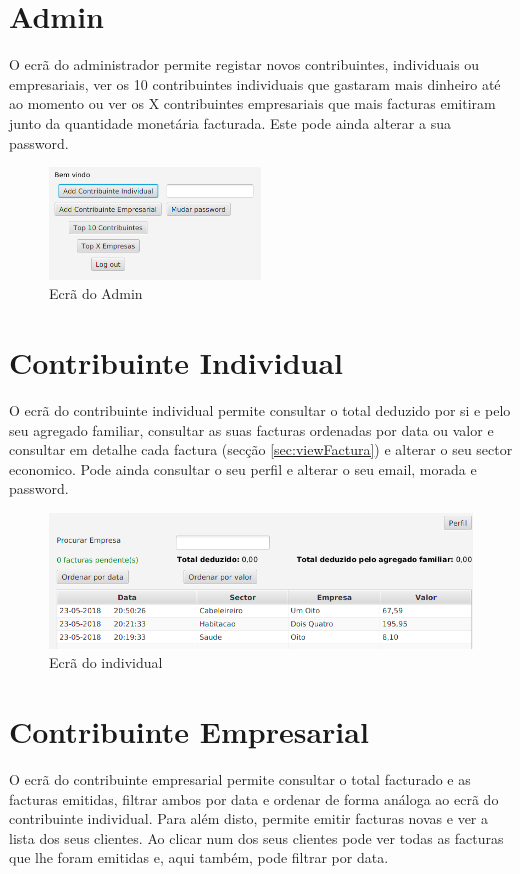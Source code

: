 \documentclass[12pt,a4paper]{report}
\begin{document}
    \section{Admin}
    O ecrã do administrador permite registar novos contribuintes, individuais
    ou empresariais, ver os 10 contribuintes individuais que gastaram mais
    dinheiro até ao momento ou ver os X contribuintes empresariais que mais
    facturas emitiram junto da quantidade monetária facturada.
    Este pode ainda alterar a sua password.
\begin{figure}[h]
    \centering
    \includegraphics[width=0.5\textwidth]{./images/AdminScreen.png}
    \caption{Ecrã do Admin}
    \label{fig:admin}
\end{figure}

\pagebreak

    \section{Contribuinte Individual}
    O ecrã do contribuinte individual permite consultar o total deduzido por
    si e pelo seu agregado familiar, consultar as suas facturas ordenadas por
    data ou valor e consultar em detalhe cada factura
    (secção \ref{sec:viewFactura}) e alterar o seu sector economico. Pode ainda
    consultar o seu perfil e alterar o seu email, morada e password.

\begin{figure}[h]
    \centering
    \includegraphics[width=\textwidth]{./images/IndividualScreen.png}
    \caption{Ecrã do individual}
    \label{fig:individual}
\end{figure}

    \section{Contribuinte Empresarial}
    O ecrã do contribuinte empresarial permite consultar o total facturado
    e as facturas emitidas, filtrar ambos por data e ordenar de
    forma análoga ao ecrã do contribuinte individual. Para além disto, permite
    emitir facturas novas e ver a lista dos seus clientes. Ao clicar num dos seus
    clientes pode ver todas as facturas que lhe foram emitidas e, aqui
    também, pode filtrar por data.
\end{document}
